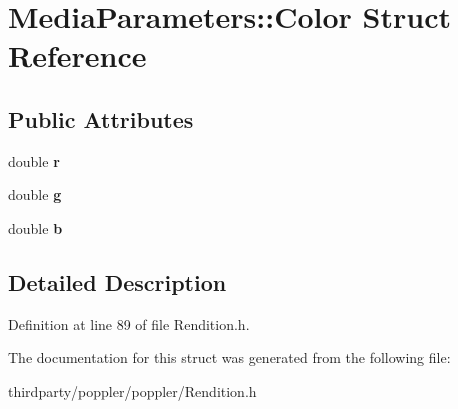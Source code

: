 \hypertarget{struct_media_parameters_1_1_color}{}\section{Media\+Parameters\+:\+:Color Struct Reference}
\label{struct_media_parameters_1_1_color}
\subsection*{Public Attributes}
\begin{DoxyCompactItemize}
\item 
\mbox{\label{struct_media_parameters_1_1_color_a3f1fc21a53aa273f3d10dc66472b0e37}} 
double {\bfseries r}
\item 
\mbox{\label{struct_media_parameters_1_1_color_adfa63b6454f281bd5232f54102b704b0}} 
double {\bfseries g}
\item 
\mbox{\label{struct_media_parameters_1_1_color_a3075ceb4bb2d1934dad2ff6d07239da7}} 
double {\bfseries b}
\end{DoxyCompactItemize}


\subsection{Detailed Description}


Definition at line 89 of file Rendition.\+h.



The documentation for this struct was generated from the following file\+:\begin{DoxyCompactItemize}
\item 
thirdparty/poppler/poppler/Rendition.\+h\end{DoxyCompactItemize}
